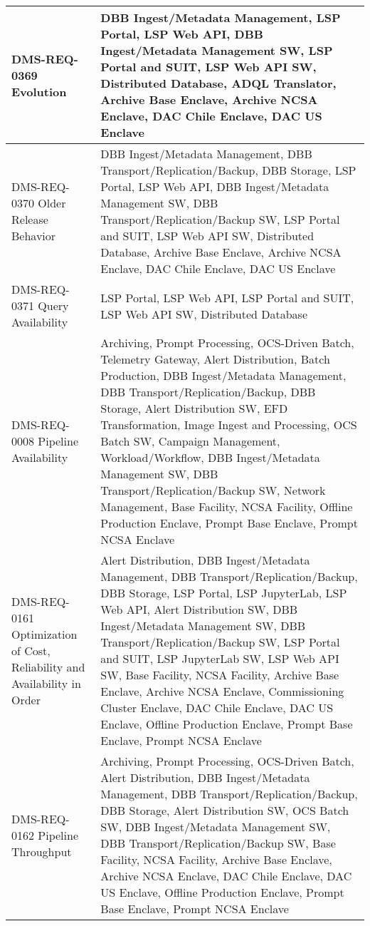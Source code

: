 \begin{xtabular}{p{0.4\textwidth}p{0.55\textwidth}}
DMS-REQ-0369 Evolution & DBB Ingest/Metadata Management, LSP Portal, LSP Web API, DBB Ingest/Metadata Management SW, LSP Portal and SUIT, LSP Web API SW, Distributed Database, ADQL Translator, Archive Base Enclave, Archive NCSA Enclave, DAC Chile Enclave, DAC US Enclave \\ \hline
DMS-REQ-0370 Older Release Behavior & DBB Ingest/Metadata Management, DBB Transport/Replication/Backup, DBB Storage, LSP Portal, LSP Web API, DBB Ingest/Metadata Management SW, DBB Transport/Replication/Backup SW, LSP Portal and SUIT, LSP Web API SW, Distributed Database, Archive Base Enclave, Archive NCSA Enclave, DAC Chile Enclave, DAC US Enclave \\ \hline
DMS-REQ-0371 Query Availability & LSP Portal, LSP Web API, LSP Portal and SUIT, LSP Web API SW, Distributed Database \\ \hline
DMS-REQ-0008 Pipeline Availability & Archiving, Prompt Processing, OCS-Driven Batch, Telemetry Gateway, Alert Distribution, Batch Production, DBB Ingest/Metadata Management, DBB Transport/Replication/Backup, DBB Storage, Alert Distribution SW, EFD Transformation, Image Ingest and Processing, OCS Batch SW, Campaign Management, Workload/Workflow, DBB Ingest/Metadata Management SW, DBB Transport/Replication/Backup SW, Network Management, Base Facility, NCSA Facility, Offline Production Enclave, Prompt Base Enclave, Prompt NCSA Enclave \\ \hline
DMS-REQ-0161 Optimization of Cost, Reliability and Availability in Order & Alert Distribution, DBB Ingest/Metadata Management, DBB Transport/Replication/Backup, DBB Storage, LSP Portal, LSP JupyterLab, LSP Web API, Alert Distribution SW, DBB Ingest/Metadata Management SW, DBB Transport/Replication/Backup SW, LSP Portal and SUIT, LSP JupyterLab SW, LSP Web API SW, Base Facility, NCSA Facility, Archive Base Enclave, Archive NCSA Enclave, Commissioning Cluster Enclave, DAC Chile Enclave, DAC US Enclave, Offline Production Enclave, Prompt Base Enclave, Prompt NCSA Enclave \\ \hline
DMS-REQ-0162 Pipeline Throughput & Archiving, Prompt Processing, OCS-Driven Batch, Alert Distribution, DBB Ingest/Metadata Management, DBB Transport/Replication/Backup, DBB Storage, Alert Distribution SW, OCS Batch SW, DBB Ingest/Metadata Management SW, DBB Transport/Replication/Backup SW, Base Facility, NCSA Facility, Archive Base Enclave, Archive NCSA Enclave, DAC Chile Enclave, DAC US Enclave, Offline Production Enclave, Prompt Base Enclave, Prompt NCSA Enclave \\ \hline

\end{xtabular}
